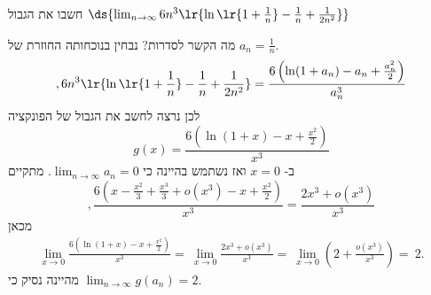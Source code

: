 חשבו את הגבול $\ds{\lim_{n\to\infty}6n^3\lr{\ln\lr{1+\frac1n}-\frac1n+\frac1{2n^2}}}$
\begin{solbox}
מה הקשר לסדרות? נבחין בנוכחותה החוזרת של
$a_n=\frac{1}{n}$.
$$,6n^3\lr{\ln\lr{1+\frac1n}-\frac1n+\frac1{2n^2}}=\frac{6\left(\ln(1+a_n)-a_n+\frac{a_n^2}{2}\right)}{a_n^3}$$
לכן נרצה לחשב את הגבול של הפונקציה
$$g(x)=\frac{6\left(\ln(1+x)-x+\frac{x^2}{2}\right)}{x^3}$$
ב-
$x=0$
ואז נשתמש בהיינה כי
$\displaystyle\lim_{n\to\infty}a_n=0$.
מתקיים
    $$,\frac{6(x-\frac{x^2}{3}+\frac{x^3}{3}+o(x^3)-x+\frac{x^2}{2})}{x^3}=\frac{2x^3+o(x^3)}{x^3}$$
מכאן
\begin{align*}
    \lim_{x\to0}\frac{6\left(\ln(1+x)-x+\frac{x^2}{2}\right)}{x^3}
    =\ \lim_{x\to0}\frac{2x^3+o(x^3)}{x^3}
    =\ \lim_{x\to0}\left(2+\frac{o(x^3)}{x^3}\right)
    =\ 2.
\end{align*}
מהיינה נסיק כי
$\displaystyle\lim_{n\to\infty}g(a_n)=2$.
\end{solbox}
